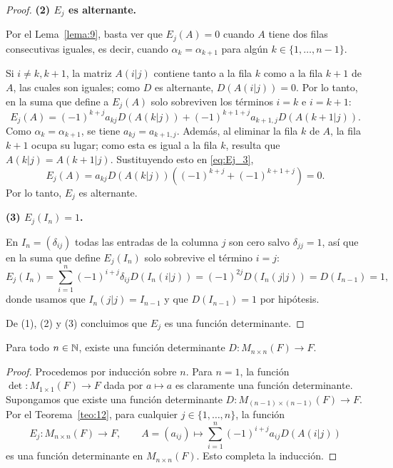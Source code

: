 \documentclass[12pt,a4paper]{book}
\newcommand{\llaves}[1]{\{#1\}}
\newcommand{\parentesis}[1]{\left(#1\right)}
\begin{document}
\begin{proof}
        \textbf{(2) $E_{j}$ es alternante.}

        Por el Lema~\ref{lema:9}, basta ver que $E_{j}(A) = 0$ cuando $A$ tiene dos filas consecutivas iguales, es decir, cuando $\alpha_{k} = \alpha_{k+1}$ para algún $k \in \llaves{1, \dots, n-1}$.

        Si $i \neq k, k+1$, la matriz $A(i|j)$ contiene tanto a la fila $k$ como a la fila $k+1$ de $A$, las cuales son iguales; como $D$ es alternante, $D(A(i|j)) = 0$. Por lo tanto, en la suma que define a $E_{j}(A)$ solo sobreviven los términos $i = k$ e $i = k+1$:
        \begin{equation}
            E_{j}(A) = (-1)^{k+j} a_{kj} D(A(k|j)) + (-1)^{k+1+j} a_{k+1,j} D(A(k+1|j)).
            \label{eq:Ej_3}
        \end{equation}
        Como $\alpha_{k} = \alpha_{k+1}$, se tiene $a_{kj} = a_{k+1,j}$. Además, al eliminar la fila $k$ de $A$, la fila $k+1$ ocupa su lugar; como esta es igual a la fila $k$, resulta que $A(k|j) = A(k+1|j)$. Sustituyendo esto en \eqref{eq:Ej_3},
        \begin{equation*}
            E_{j}(A) = a_{kj} D(A(k|j)) \parentesis{(-1)^{k+j} + (-1)^{k+1+j}} = 0.
        \end{equation*}
        Por lo tanto, $E_{j}$ es alternante.

        \textbf{(3) $E_{j}(I_{n}) = 1$.}

        En $I_{n} = (\delta_{ij})$ todas las entradas de la columna $j$ son cero salvo $\delta_{jj} = 1$, así que en la suma que define $E_{j}(I_{n})$ solo sobrevive el término $i = j$:
        \begin{equation*}
            E_{j}(I_{n}) = \sum_{i=1}^{n} (-1)^{i+j} \delta_{ij} D(I_{n}(i|j)) = (-1)^{2j} D(I_{n}(j|j)) = D(I_{n-1}) = 1,
        \end{equation*}
        donde usamos que $I_{n}(j|j) = I_{n-1}$ y que $D(I_{n-1}) = 1$ por hipótesis.

        De (1), (2) y (3) concluimos que $E_{j}$ es una función determinante.
    \end{proof}

    \begin{corolario}
    \label{coro:6}
        Para todo $n \in \mathbb{N}$, existe una función determinante $D: M_{n \times n}(F) \to F$.
    \end{corolario}

    \begin{proof}
        Procedemos por inducción sobre $n$. Para $n = 1$, la función $\det: M_{1 \times 1}(F) \to F$ dada por $a \mapsto a$ es claramente una función determinante. Supongamos que existe una función determinante $D: M_{(n-1) \times (n-1)}(F) \to F$. Por el Teorema~\ref{teo:12}, para cualquier $j \in \llaves{1, \dots, n}$, la función
        \begin{equation*}
            E_{j} : M_{n \times n}(F) \to F, \qquad A = (a_{ij}) \mapsto \sum_{i=1}^{n} (-1)^{i+j} a_{ij} D(A(i|j))
        \end{equation*}
        es una función determinante en $M_{n \times n}(F)$. Esto completa la inducción.
    \end{proof}
\end{document}
